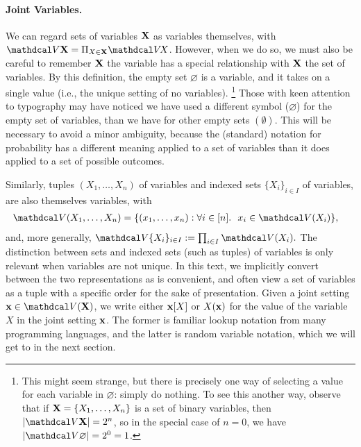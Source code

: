 \paragraph{Joint Variables.}
We can regard sets of variables $\mathbf X$ as variables themselves, with
$\V \mat X = \Pi_{X \in \mat X} \V\! X$.
However, when we do so, we must also be careful to remember $\mathbf X$ the variable has a special relationship with $\mathbf X$ the set of variables. 
By this definition, the empty set $\varnothing$ is a variable, and it takes on a single value (i.e., the unique setting of no variables).%
\footnote{%
    This might seem strange, but there is precisely one way of selecting a value for each variable in $\varnothing$: simply do nothing. To see this another way, observe that if $\mathbf X = \{ X_1, \ldots, X_n \}$ is a set of binary variables,
    then $|\V\mat X| = 2^n$, so in the special case of $n=0$, we have $|\V \varnothing | = 2^0 = 1$. 
    }
Those with keen attention to typography may have noticed we have used a different symbol ($\varnothing$) for the empty set of variables, than we have for other empty sets $(\emptyset)$. 
This will be necessary to avoid a minor ambiguity, because the (standard) notation for probability has a different meaning applied to a set of variables than it does applied to a set of possible outcomes. 

Similarly, tuples $(X_1, \ldots, X_n)$ of variables and indexed sets $\{X_i\}_{i \in I}$ of variables, are also themselves variables,
with
\begin{align*}
    \V(X_1, \ldots, X_n) &= \{ (x_1, \ldots, x_n) : \forall i \in [n].~~ x_i \in \V(X_i) \},
\end{align*}
and, more generally,
$
    \V\{ X_i \}_{i \in I} := \prod_{i \in I} \V(X_i).
$
The distinction between sets and indexed sets (such as tuples) of variables is only relevant when variables are not unique.
In this text, we implicitly convert between the two representations as is convenient, and often view a set of variables as a tuple with a specific order for the sake of presentation.
%
Given a joint setting $\mat x \in \V(\mat X)$, we write either $\mathbf x[X]$ or  $X(\mathbf x)$ for the value of the variable $X$ in the joint setting $\mathbf x$. The former is familiar lookup notation from many programming languages, and the latter is random variable notation, which we will get to in the next section.

